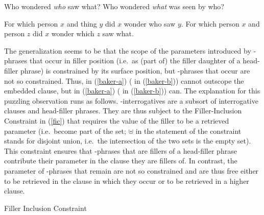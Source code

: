 \documentclass[output=paper
	        ,collection
	        ,collectionchapter
 	        ,biblatex
                ,babelshorthands
                ,newtxmath
                ,draftmode
                ,colorlinks, citecolor=brown
]{langscibook}
\begin{document}
\begin{exe}
\ex\label{baker-exs}
\begin{xlist}
\ex\label{baker-a} Who wondered \emph{who} saw what?
\ex\label{baker-b} Who wondered \emph{what} was seen by who?
\end{xlist}
\ex\label{baker-sem}
\begin{xlist}
\ex\label{baker-sem-a}For which person $x$ and thing $y$ did $x$ wonder who saw $y$.
\ex\label{baker-sem-b}For which person $x$ and person $z$ did $x$ wonder which $z$ saw what.
\end{xlist}
\end{exe}

The generalization seems to be that the scope of the parameters  introduced by -phrases that occur in filler position (i.e.\ as (part of) the filler daughter of a head-filler phrase) is constrained by its surface position, but -phrases that occur  are not so constrained. Thus,  in (\ref{baker-a})  ( in (\ref{baker-b})) cannot outscope the embedded clause, but  in (\ref{baker-a}) ( in (\ref{baker-b})) can.
The explanation for this puzzling observation runs as follows. -interrogatives are a subsort of interrogative clauses and head-filler phrases. They are thus subject to the Filler-Inclusion Constraint in (\ref{fic}) that requires the  value of the filler to be a retrieved parameter (i.e.\ become part of the  set; $\uplus$ in the statement of the constraint stands for disjoint union, i.e.\ the intersection of the two sets is the empty set). 
This constraint ensures that -phrases that are fillers of a head-filler phrase contribute their parameter in the clause they are fillers of. In contrast, the parameter of -phrases that remain  are not so constrained and are thus free either to be retrieved in the clause in which they occur or to be retrieved in a higher clause. 

\begin{exe}
\ex\label{fic}Filler Inclusion Constraint  \\
\end{exe}
\end{document}
